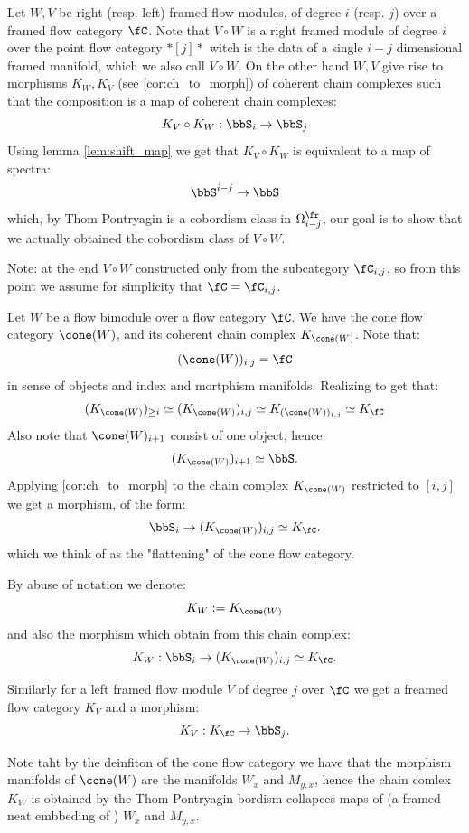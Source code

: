 
Let $W,V$ be right (resp. left) framed flow modules, of degree $i$ (resp. $j$) over a framed flow category $\fC$.
Note that $V \circ W$ is a right framed module of degree $i$ over the point flow category $*[j]*$ witch is the data of a single $i-j$ dimensional framed manifold, which we also call $V \circ W$. 
On the other hand $W,V$ give rise to morphisms $K_W,K_V$ (see \cref{cor:ch_to_morph}) of coherent chain complexes such that the composition is a map of coherent chain complexes:
\[
    K_V \circ K_W : \bbS_i \to \bbS_j
\]
Using lemma \cref{lem:shift_map} we get that $K_V \circ K_W$ is equivalent to a map of spectra:
\[
    \bbS^{i-j} \to \bbS
\]
which, by Thom Pontryagin is a cobordism class in $\Omega^{\fr}_{i-j}$, our goal is to show that we actually obtained the cobordism class of $V \circ W$.

Note: at the end $V \circ W$ constructed only from the subcategory $\fC_{i,j}$, so from this point we assume for simplicity that $\fC = \fC_{i,j}$.

Let $W$ be a flow bimodule over a flow category $\fC$. We have the cone flow category $\cone(W)$, and its coherent chain complex $K_{\cone(W)}$.
Note that:
\[
    (\cone(W))_{i,j} = \fC
\]
in sense of objects and index and mortphism manifolds.
Realizing to get that:
\[
    (K_{\cone(W)})_{\geq i} \simeq (K_{\cone(W)})_{i,j} \simeq K_{(\cone(W))_{i,j}} \simeq K_{\fC}
\]
Also note that $\cone(W)_{i+1}$ consist of one object, hence 
\[
    (K_{\cone(W)})_{i+1} \simeq \bbS.
\]
Applying \cref{cor:ch_to_morph} to the chain complex $K_{\cone(W)}$ restricted to $[i,j]$ we get a morphism, of the form:
\[
    \bbS_i \to (K_{\cone(W)})_{i,j} \simeq K_{\fC}.
\]
which we think of as the "flattening" of the cone flow category.

By abuse of notation we denote:
\[
    K_W := K_{\cone(W)}
\]
and also the morphism which obtain from this chain complex:
\[
  K_W : \bbS_i \to (K_{\cone(W)})_{i,j} \simeq K_{\fC}.  
\]

Similarly for a left framed flow module $V$ of degree $j$ over $\fC$ we get a freamed flow category $K_V$ and a morphism:
\[
    K_V : K_{\fC} \to \bbS_j.
\]

Note taht by the deinfiton of the cone flow category we have that the morphism manifolds of $\cone(W)$ are the manifolds $W_x$ and $M_{y,x}$, hence the chain comlex $K_W$ is obtained by the Thom Pontryagin bordism collapces maps of (a framed neat embbeding of ) $W_x$ and $M_{y,x}$.

